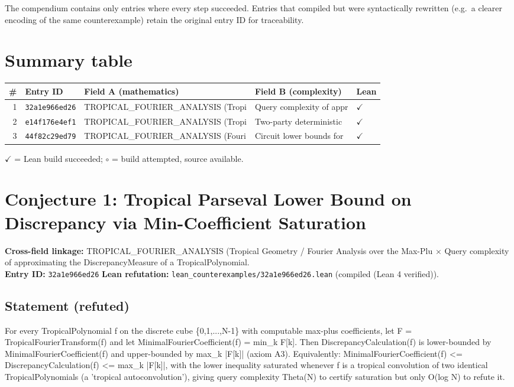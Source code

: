 \documentclass[11pt,a4paper]{article}
\begin{document}
The compendium contains only entries where every step succeeded. Entries
that compiled but were syntactically rewritten (e.g.\ a clearer encoding
of the same counterexample) retain the original entry ID for traceability.


\section{Summary table}
\begin{center}
\begin{tabular}{rllll}
\toprule
\# & Entry ID & Field A (mathematics) & Field B (complexity) & Lean \\
\midrule
1 & \texttt{32a1e966ed26} & TROPICAL\_FOURIER\_ANALYSIS (Tropi & Query complexity of appr & $\checkmark$ \\
2 & \texttt{e14f176e4ef1} & TROPICAL\_FOURIER\_ANALYSIS (Tropi & Two-party deterministic  & $\checkmark$ \\
3 & \texttt{44f82c29ed79} & TROPICAL\_FOURIER\_ANALYSIS (Fouri & Circuit lower bounds for & $\checkmark$ \\
\bottomrule
\end{tabular}
\end{center}
$\checkmark$ = Lean build succeeded; $\circ$ = build attempted, source available.


\section{Conjecture 1: Tropical Parseval Lower Bound on Discrepancy via Min-Coefficient Saturation}
\textbf{Cross-field linkage:} TROPICAL\_FOURIER\_ANALYSIS (Tropical Geometry / Fourier Analysis over the Max-Plu $\times$ Query complexity of approximating the DiscrepancyMeasure of a TropicalPolynomial.\\
\textbf{Entry ID:} \texttt{32a1e966ed26}\quad
\textbf{Lean refutation:} \texttt{lean\_counterexamples/32a1e966ed26.lean} (compiled (Lean 4 verified)).

\subsection*{Statement (refuted)}
For every TropicalPolynomial f on the discrete cube \{0,1,...,N-1\} with computable max-plus coefficients, let F = TropicalFourierTransform(f) and let MinimalFourierCoefficient(f) = min\_k F[k]. Then DiscrepancyCalculation(f) is lower-bounded by MinimalFourierCoefficient(f) and upper-bounded by max\_k |F[k]| (axiom A3). Equivalently: MinimalFourierCoefficient(f) <= DiscrepancyCalculation(f) <= max\_k |F[k]|, with the lower inequality saturated whenever f is a tropical convolution of two identical TropicalPolynomials (a 'tropical autoconvolution'), giving query complexity Theta(N) to certify saturation but only O(log N) to refute it.
\end{document}
